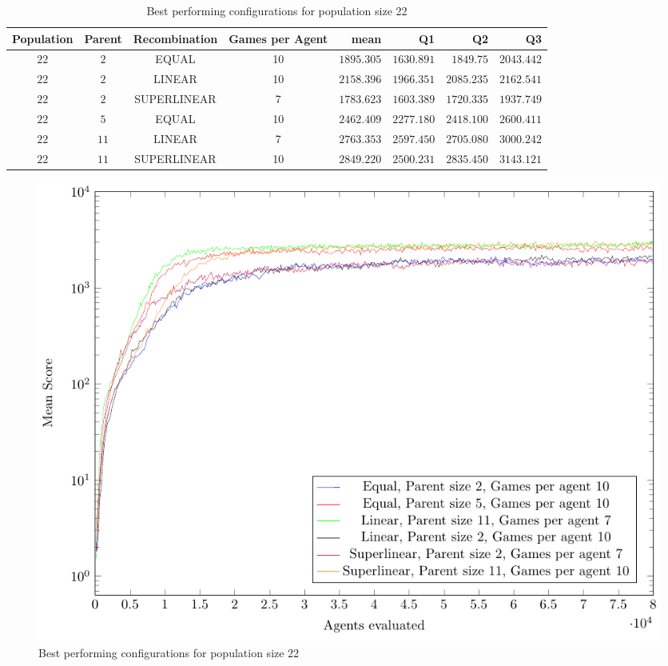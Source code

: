 \begin{table}[H]
\centering
\small
\begin{tabular}{c c c c r r r r}
Population & Parent & Recombination & Games per Agent & mean & Q1 & Q2 & Q3\\
\hline
$22$ & $2$ & EQUAL & 10 & $1895.305$ & $1630.891$ & $1849.75$ & $2043.442$\\
$22$ & $2$ & LINEAR & 10 & $2158.396$ & $1966.351$ & $2085.235$ & $2162.541$\\
$22$ & $2$ & SUPERLINEAR & 7 & $1783.623$ & $1603.389$ & $1720.335$ & $1937.749$\\
$22$ & $5$ & EQUAL & 10 & $2462.409$ & $2277.180$ & $2418.100$ & $2600.411$\\
$22$ & $11$ & LINEAR & 7 & $2763.353$ & $2597.450$ & $2705.080$ & $3000.242$\\
$22$ & $11$ & SUPERLINEAR & 10 & $2849.220$ & $2500.231$ & $2835.450$ & $3143.121$\\
\end{tabular}
\caption{Best performing configurations for population size 22}
\end{table}

\begin{figure}[H]
\centering
\caption{Best performing configurations for population size 22}
\includegraphics[scale=1]{data/cma_population_offspring/bestofeach_population/22x/PlotFile.pdf}
\end{figure}

\clearpage

